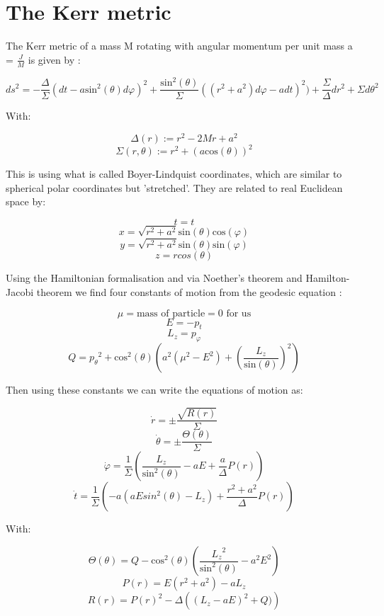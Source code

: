 \documentclass[oneside,openright,frontopenright]{dmathesis}
\begin{document}
\section{The Kerr metric}

	The Kerr metric of a mass M rotating with angular momentum per unit mass a = $\frac{J}{M}$ is given by \cite{raquepas2017topics}:

	\[{ds^{2} = -\frac{\Delta}{\Sigma}(dt-a\mbox{sin}^2(\theta)d\varphi)^2+\frac{\mbox{sin}^2(\theta)}{\Sigma}((r^2+a^2)d\varphi-adt)^2)+\frac{\Sigma}{\Delta}dr^2+\Sigma d\theta^2}\]

	With:
	
	\[\Delta(r) := r^2 - 2Mr + a^2\]
	\[\Sigma(r, \theta) := r^2 +(a\mbox{cos}(\theta))^2\]

	This is using what is called Boyer-Lindquist coordinates, which are similar to spherical polar coordinates but 'stretched'. They are related to real Euclidean space by:

	\[t=t\]
	\[x = \sqrt{r^2+a^2}\mbox{sin}(\theta)\mbox{cos}(\varphi)\]
	\[y = \sqrt{r^2+a^2}\mbox{sin}(\theta)\mbox{sin}(\varphi)\]
	\[z = rcos(\theta)\]

	Using the Hamiltonian formalisation and via Noether's theorem and Hamilton-Jacobi theorem we find four constants of motion from the geodesic equation \cite{}:

	\[\mu = \mbox{mass of particle} = 0\mbox{ for us}\]
	\[E = -p_t\]
	\[L_z = p_{\varphi}\]
	\[Q = {p_{\theta}}^2+\mbox{cos}^2(\theta)\left(a^2(\mu^2-E^2)+\left(\frac{L_z}{\mbox{sin}(\theta)}\right)^2\right)\]

	Then using these constants we can write the equations of motion as:

	\[\dot{r} = \pm\frac{\sqrt{R(r)}}{\Sigma}\]
	\[\dot{\theta} = \pm\frac{\Theta(\theta)}{\Sigma}\]
	\[\dot{\varphi} = \frac{1}{\Sigma}\left(\frac{L_z}{\mbox{sin}^2(\theta)}-aE+\frac{a}{\Delta}P(r)\right)\]
	\[\dot{t} = \frac{1}{\Sigma}\left(-a(aEsin^2(\theta)-L_z)+\frac{r^2+a^2}{\Delta}P(r)\right)\]

	With:

	\[\Theta(\theta) = Q - \mbox{cos}^2(\theta)\left(\frac{{L_z}^2}{\mbox{sin}^2(\theta)}-a^2E^2\right)\]
	\[P(r) = E(r^2+a^2)-aL_z\]
	\[R(r) = P(r)^2-\Delta\left((L_z-aE)^2+Q)\right)\]

\appendix
%
%


{}
\end{document}
